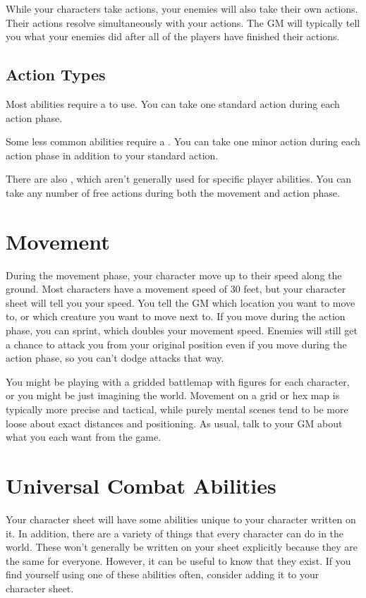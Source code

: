   While your characters take actions, your enemies will also take their own actions.
  Their actions resolve simultaneously with your actions.
  The GM will typically tell you what your enemies did after all of the players have finished their actions.

  \subsection{Action Types}
    Most abilities require a  to use.
    You can take one standard action during each action phase.

    Some less common abilities require a .
    You can take one minor action during each action phase in addition to your standard action.

    There are also , which aren't generally used for specific player abilities.
    You can take any number of free actions during both the movement and action phase.

\section{Movement}\label{Movement}
  During the movement phase, your character move up to their speed along the ground.
  Most characters have a movement speed of 30 feet, but your character sheet will tell you your speed.
  You tell the GM which location you want to move to, or which creature you want to move next to.
  If you move during the action phase, you can sprint, which doubles your movement speed.
  Enemies will still get a chance to attack you from your original position even if you move during the action phase, so you can't dodge attacks that way.

  You might be playing with a gridded battlemap with figures for each character, or you might be just imagining the world.
  Movement on a grid or hex map is typically more precise and tactical, while purely mental scenes tend to be more loose about exact distances and positioning.
  As usual, talk to your GM about what you each want from the game.

\section{Universal Combat Abilities}
  Your character sheet will have some abilities unique to your character written on it.
  In addition, there are a variety of things that every character can do in the world.
  These won't generally be written on your sheet explicitly because they are the same for everyone.
  However, it can be useful to know that they exist.
  If you find yourself using one of these abilities often, consider adding it to your character sheet.

